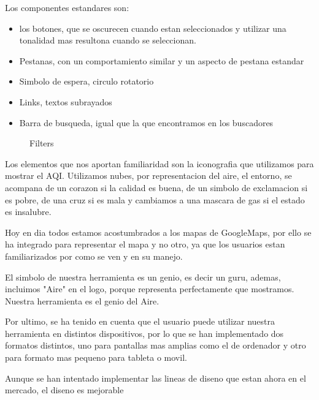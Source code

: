 Los componentes estandares son:
\begin{itemize}
 \item los botones, que se oscurecen cuando estan seleccionados y utilizar una tonalidad mas resultona cuando se seleccionan.
\item Pestanas, con un comportamiento similar y un aspecto de pestana estandar
\item Simbolo de espera, circulo rotatorio
\item Links, textos subrayados
\item Barra de busqueda, igual que la que encontramos en los buscadores
\end{itemize}



\begin{figure}[ht]
    \centering
    \hfill
    \vfill
  
  \caption{Filters}
    \end{figure}
Los elementos que nos aportan familiaridad son la iconografia que utilizamos para mostrar el AQI. Utilizamos nubes, por representacion
del aire, el entorno, se acompana de un corazon si la calidad es buena, de un simbolo de exclamacion si es pobre, de una cruz si es 
mala y cambiamos a una mascara de gas si el estado es insalubre.

Hoy en dia todos estamos acostumbrados a los mapas de GoogleMaps, por ello se ha integrado para representar el mapa y no otro,
ya que los usuarios estan familiarizados por como se ven y en su manejo.

El simbolo de nuestra herramienta es un genio, es decir un guru, ademas, incluimos "Aire" en el logo, porque representa perfectamente
que mostramos. Nuestra herramienta es el genio del Aire.

Por ultimo, se ha tenido en cuenta que el usuario puede utilizar nuestra herramienta en distintos dispositivos, por lo que se han implementado 
dos formatos distintos, uno para pantallas mas amplias como el de ordenador y otro para formato mas pequeno para tableta o movil.


\begin{itemize}
    \done
    \crossed
    \crossed Aunque se han intentado implementar las lineas de diseno que estan ahora en el mercado, el diseno es mejorable
\end{itemize}

\newpage